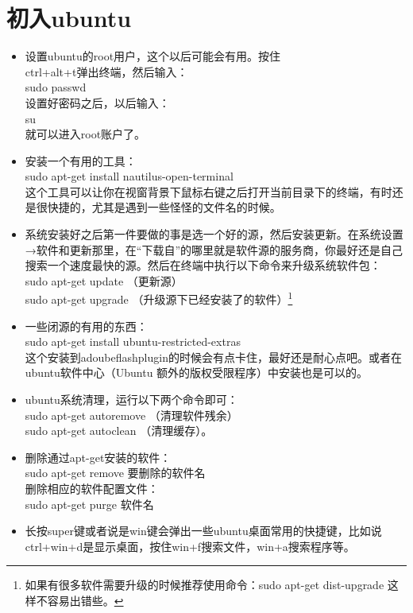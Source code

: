 \documentclass[11pt,oneside]{book}
\begin{document}
\section{初入ubuntu}
\begin{itemize}
\item 设置ubuntu的root用户，这个以后可能会有用。按住\\
ctrl+alt+t弹出终端，然后输入：\\ sudo passwd \\设置好密码之后，以后输入：\\ su\\就可以进入root账户了。
\item 安装一个有用的工具：\\sudo apt-get install nautilus-open-terminal\\这个工具可以让你在视窗背景下鼠标右键之后打开当前目录下的终端，有时还是很快捷的，尤其是遇到一些怪怪的文件名的时候。
\item 系统安装好之后第一件要做的事是选一个好的源，然后安装更新。在系统设置→软件和更新那里，在“下载自”的哪里就是软件源的服务商，你最好还是自己搜索一个速度最快的源。然后在终端中执行以下命令来升级系统软件包：\\sudo apt-get update  （更新源）\\sudo apt-get upgrade   （升级源下已经安装了的软件）\footnote{如果有很多软件需要升级的时候推荐使用命令：sudo apt-get dist-upgrade 这样不容易出错些。}
\item 一些闭源的有用的东西：\\sudo apt-get install ubuntu-restricted-extras\\这个安装到adoubeflashplugin的时候会有点卡住，最好还是耐心点吧。或者在ubuntu软件中心（Ubuntu 额外的版权受限程序）中安装也是可以的。
\item ubuntu系统清理，运行以下两个命令即可：\\sudo apt-get autoremove （清理软件残余）\\sudo apt-get autoclean  （清理缓存）。
\item 删除通过apt-get安装的软件：\\sudo apt-get remove 要删除的软件名\\删除相应的软件配置文件：\\sudo apt-get purge 软件名
\item 长按super键或者说是win键会弹出一些ubuntu桌面常用的快捷键，比如说ctrl+win+d是显示桌面，按住win+f搜索文件，win+a搜索程序等。
\end{itemize}
\end{document}
